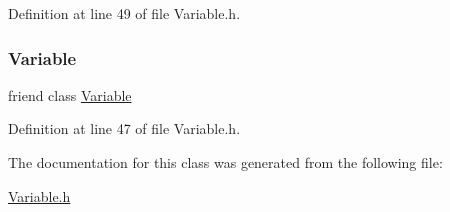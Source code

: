 Definition at line 49 of file Variable.\+h.

\hypertarget{classocra_1_1VariableHasRestrictedClassDerivation_a9b0a9a1a9dc58fc36b535bb33c612b49}{}\label{classocra_1_1VariableHasRestrictedClassDerivation_a9b0a9a1a9dc58fc36b535bb33c612b49} 
\subsubsection{\texorpdfstring{Variable}{Variable}}
{\footnotesize\ttfamily friend class \hyperlink{classocra_1_1Variable}{Variable}\hspace{0.3cm}{\ttfamily [friend]}}



Definition at line 47 of file Variable.\+h.



The documentation for this class was generated from the following file\+:\begin{DoxyCompactItemize}
\item 
\hyperlink{Variable_8h}{Variable.\+h}\end{DoxyCompactItemize}
